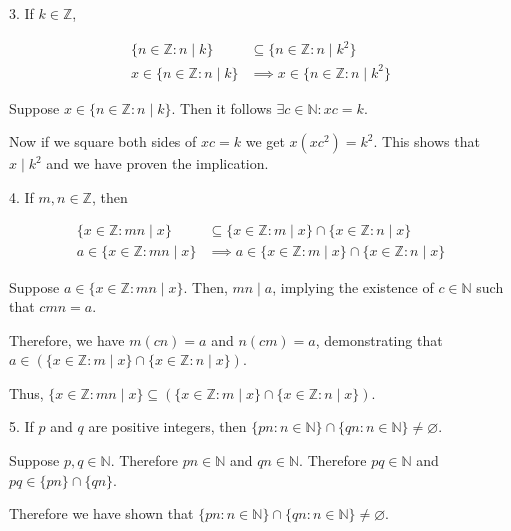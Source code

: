 \documentclass{idrisMemo}
\newcommand{\set}[1]{\{#1\}}
\begin{document}
\begin{prooflist}{3. If $k \in \mathbb{Z}$,}
    \item

\begin{align*}
    \set{n \in \mathbb{Z}: n \mid k} &\subseteq \set{n \in \mathbb{Z}: n \mid k^2} \\
    x \in \set{n \in \mathbb{Z}: n \mid k} &\implies x \in \set{n \in \mathbb{Z}: n \mid k^2}
\end{align*}
\item Suppose $x \in \set{n \in \mathbb{Z}: n \mid k}$. Then it follows $\exists
    c\in\mathbb{N}: xc=k$.
\item Now if we square both sides of
$xc=k$ we get $x(xc^2) = k^2$.  This shows that $x\mid k^2$ and we have proven
the implication.
\end{prooflist}

\begin{prooflist}{4. If $m, n \in \mathbb{Z}$, then}
\item
\begin{align*}
    \set{x \in \mathbb{Z}: mn \mid x} &\subseteq \set{x \in \mathbb{Z}: m \mid x} \cap \set{x \in \mathbb{Z}: n \mid x} \\
    a \in \set{x \in \mathbb{Z}: mn \mid x} &\implies a \in \set{x \in \mathbb{Z}: m \mid x} \cap \set{x \in \mathbb{Z}: n \mid x}
\end{align*}
\item Suppose $a \in \set{x \in \mathbb{Z}: mn \mid x}$. Then, $mn \mid a$, implying the existence of $c \in \mathbb{N}$ such that $cmn = a$.
\item Therefore, we have $m(cn) = a$ and $n(cm) = a$, demonstrating that $a \in \left(\set{x \in \mathbb{Z}: m \mid x} \cap \set{x \in \mathbb{Z}: n \mid x}\right)$.
\item Thus, $\set{x \in \mathbb{Z}: mn \mid x} \subseteq \left(\set{x \in \mathbb{Z}: m \mid x} \cap \set{x \in \mathbb{Z}: n \mid x}\right)$.
\end{prooflist}

\begin{prooflist}{5. If $p$ and $q$ are positive integers, then $\{p n: n \in
\mathbb{N}\} \cap\{q n: n \in \mathbb{N}\} \neq \varnothing$.}
\item Suppose $p, q \in \mathbb{N}$. Therefore $pn \in \mathbb{N}$ and
    $qn \in \mathbb{N}$. Therefore $pq \in \mathbb{N}$ and $pq \in \set{pn} \cap
    \set{qn}$.
\item Therefore we have shown that
$\{p n: n \in \mathbb{N}\} \cap\{q n: n \in \mathbb{N}\} \neq \varnothing$.
\end{prooflist}
\end{document}
